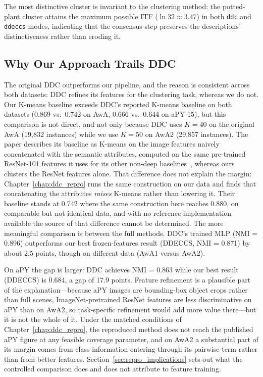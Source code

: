 The most distinctive cluster is invariant to the clustering method: the potted-plant cluster attains the maximum possible ITF ($\ln 32 \approx 3.47$) in both \texttt{ddc} and \texttt{ddeccs} modes, indicating that the consensus step preserves the descriptions' distinctiveness rather than eroding it.


\subsection{Why Our Approach Trails DDC}
\label{subsec:trails_ddc}

The original DDC outperforms our pipeline, and the reason is consistent across both datasets: DDC refines its features for the clustering task, whereas we do not. Our K-means baseline exceeds DDC's reported K-means baseline on both datasets (0.869 vs.\ 0.742 on AwA, 0.666 vs.\ 0.644 on aPY-15), but this comparison is not direct, and not only because DDC uses $K = 40$ on the original AwA (19{,}832 instances) while we use $K = 50$ on AwA2 (29{,}857 instances). The paper describes its baseline as K-means on the image features naively concatenated with the semantic attributes, computed on the same pre-trained ResNet-101 features it uses for its other non-deep baselines~\citep[Sec.~4.4]{Zhang2021}, whereas ours clusters the ResNet features alone. That difference does not explain the margin: Chapter~\ref{chap:ddc_repro} runs the same construction on our data and finds that concatenating the attributes \emph{raises} K-means rather than lowering it. Their baseline stands at 0.742 where the same construction here reaches 0.880, on comparable but not identical data, and with no reference implementation available the source of that difference cannot be determined. The more meaningful comparison is between the full methods. DDC's trained MLP (NMI = 0.896) outperforms our best frozen-features result (DDECCS, NMI = 0.871) by about 2.5 points, though on different data (AwA1 versus AwA2).

On aPY the gap is larger: DDC achieves NMI = 0.863 while our best result (DDECCS) is 0.684, a gap of 17.9 points. Feature refinement is a plausible part of the explanation---because aPY images are bounding-box object crops rather than full scenes, ImageNet-pretrained ResNet features are less discriminative on aPY than on AwA2, so task-specific refinement would add more value there---but it is not the whole of it. Under the matched conditions of Chapter~\ref{chap:ddc_repro}, the reproduced method does not reach the published aPY figure at any feasible coverage parameter, and on AwA2 a substantial part of its margin comes from class information entering through its pairwise term rather than from better features. Section~\ref{sec:repro_implications} sets out what the controlled comparison does and does not attribute to feature training.

